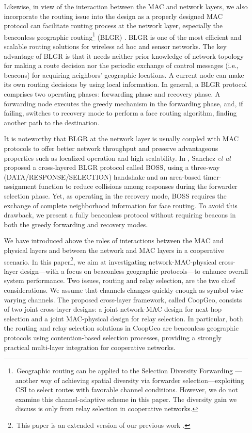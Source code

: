 \documentclass[journal,twoside,final]{IEEEtran}
\begin{document}
Likewise, in view of the interaction between the MAC and network layers, we also incorporate the routing issue into the design as a properly designed MAC protocol can facilitate routing process at the network layer, especially the beaconless geographic routing\footnote{\,Geographic routing can be applied to the Selection Diversity Forwarding \cite{Larsson2001,Souryal2005}---another way of achieving spatial diversity via forwarder selection---exploiting CSI to select routes with favorable channel conditions. However, we do not examine this channel-adaptive scheme in this paper. The diversity gain we discuss is only from relay selection in cooperative networks.} (BLGR) \cite{SRM2009,Heissen2003,Fubler2003,ZR2003,Blum2003,Casari2005,Sanchez2007}. BLGR is one of the most efficient and scalable routing solutions for wireless ad hoc and sensor networks. The key advantage of BLGR is that it needs neither prior knowledge of network topology for making a route decision nor the periodic exchange of control messages (i.e., beacons) for acquiring neighbors' geographic locations. A current node can make its own routing decisions by using local information.
In general, a BLGR protocol comprises two operating phases: forwarding phase and recovery phase. A forwarding node executes the greedy mechanism in the forwarding phase, and, if failing, switches to recovery mode to perform a face routing algorithm, finding another path to the destination.


It is noteworthy that BLGR at the network layer is usually coupled with MAC protocols to offer better network throughput and preserve advantageous properties such as localized operation and high scalability.
In \cite{Sanchez2007}, Sanchez \textit{et al} proposed a cross-layered BLGR protocol called BOSS, using a three-way (DATA/RESPONSE/SELECTION) handshake and an area-based timer-assignment function to reduce collisions among responses during the forwarder selection phase. Yet, as operating in the recovery mode, BOSS requires the exchange of complete neighborhood information for face routing. To avoid this drawback, we present a fully beaconless protocol without requiring beacons in both the greedy forwarding and recovery modes.

We have introduced above the roles of interactions between the MAC and physical layers and between the network and MAC layers in a cooperative scenario. In this paper\footnote{\,This paper is an extended version of our previous work \cite{AGSGAW2010}.}, we aim at investigating network-MAC-physical cross-layer design---with a focus on beaconless geographic protocols---to enhance overall system performance. Two issues, routing and relay selection, are the two chief considerations.
We assume that channels changes quickly enough as symbol-wise varying channels.
The proposed cross-layer framework, called CoopGeo, consists of two joint cross-layer designs: a joint network-MAC design for next hop selection and a joint MAC-physical design for relay selection. In particular, both the routing and relay selection solutions in CoopGeo are beaconless geographic protocols using contention-based selection processes, providing a strongly practical multi-layer integration for cooperative networks.
\end{document}
